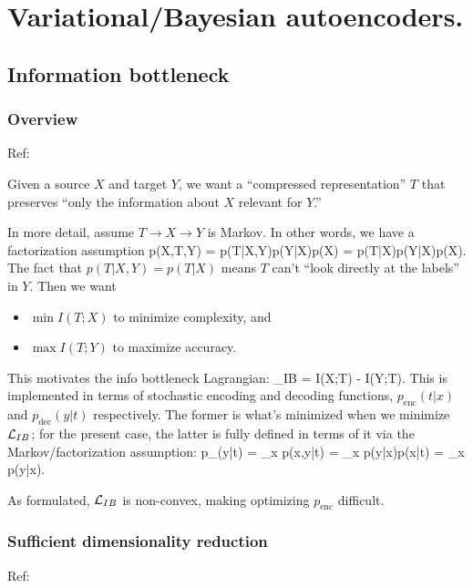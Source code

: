 \documentclass[notitlepage,openany,11pt]{report}
\theoremstyle{plain}%
\numberwithin{equation}{section}
\begin{document}
\chapter{Variational/Bayesian autoencoders.}

\section{Information bottleneck}

\subsection{Overview}
Ref: \cite{TishbyEtAl:99}

Given a source $X$ and target $Y$, we want a ``compressed representation'' $T$ that preserves ``only the information about $X$ relevant for $Y$.'' 

In more detail, assume $T \rightarrow X \rightarrow Y$ is Markov. In other words, we have a factorization assumption
\be
p(X,T,Y) = p(T|X,Y)p(Y|X)p(X) = p(T|X)p(Y|X)p(X).
\ee
The fact that $p(T|X,Y) = p(T|X)$ means $T$ can't ``look directly at the labels'' in $Y$. Then we want 
\begin{itemize}
\item $\min I(T;X)$ to minimize complexity, and
\item $\max I(T;Y)$ to maximize accuracy.
\end{itemize}
This motivates the info bottleneck Lagrangian:
\be
{}_{IB} = I(X;T) - \beta I(Y;T).
 This is implemented in terms of stochastic encoding and decoding functions, $p_{\text{enc}}(t|x)$ and $p_{\text{dec}}(y|t)$ respectively. The former is what's minimized when we minimize $\mcal{L}_{IB}$; for the present case, the latter is fully defined in terms of it via the Markov/factorization assumption:
\be
p_{}(y|t) = \sum_{x} p(x,y|t) = \sum_{x} p(y|x)p(x|t) = \sum_{x} p(y|x).
\ee

As formulated, $\mathcal{L}_{IB}$ is non-convex, making optimizing $p_{\text{enc}}$ difficult.


\subsection{Sufficient dimensionality reduction}
Ref: \cite{GlobersonTishby:03}
\end{document}
